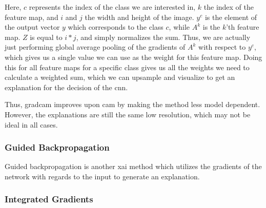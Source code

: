 \documentclass[UKenglish]{uiomasterthesis} %
\theoremstyle{definition}
\begin{document}
Here, $c$ represents the index of the class we are interested in, $k$ the index of the feature map, and $i$ and $j$ the width and height of the image. $y^c$ is the element of the output vector $y$ which corresponds to the class $c$, while $A^k$ is the $k$'th feature map. $Z$ is equal to $i * j$, and simply normalizes the sum. Thus, we are actually just performing global average pooling of the gradients of $A^k$ with respect to $y^c$, which gives us a single value we can use as the weight for this feature map. Doing this for all feature maps for a specific class gives us all the weights we need to calculate a weighted sum, which we can upsample and visualize to get an explanation for the decision of the \ac{cnn}.

Thus, \ac{gradcam} improves upon \ac{cam} by making the method less model dependent. However, the explanations are still the same low resolution, which may not be ideal in all cases.
\\

\subsubsection{Guided Backpropagation}

Guided backpropagation is another \ac{xai} method which utilizes the gradients of the network with regards to the input to generate an explanation.

\subsubsection{Integrated Gradients}
\end{document}
